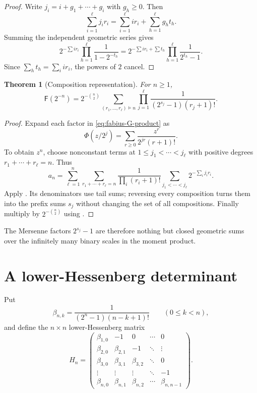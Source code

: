 \documentclass[11pt,oneside,openany]{book}
\newtheorem{theorem}{Theorem}[chapter]
\theoremstyle{definition}
\theoremstyle{remark}
\newcommand{\Fab}{\mathsf F}
\begin{document}
\begin{proof}
Write
$j_i=i+g_1+\cdots+g_i$ with $g_h\ge0$.  Then
\[
 \sum_{i=1}^\ell j_ir_i
 =\sum_{i=1}^\ell ir_i+\sum_{h=1}^\ell g_ht_h.
\]
Summing the independent geometric series gives
\[
 2^{-\sum ir_i}\prod_{h=1}^\ell\frac1{1-2^{-t_h}}
 =2^{-\sum ir_i+\sum t_h}\prod_{h=1}^\ell\frac1{2^{t_h}-1}.
\]
Since $\sum_ht_h=\sum_iir_i$, the powers of $2$ cancel.
\end{proof}

\begin{theorem}[Composition representation]\label{thm:fabius-composition}
For $n\ge1$,
\begin{equation}\label{eq:fabius-composition}
 \boxed{
 \Fab(2^{-n})=2^{-\binom n2}
 \sum_{(r_1,\ldots,r_\ell)\vDash n}
 \prod_{j=1}^\ell
 \frac1{(2^{s_j}-1)(r_j+1)!}.}
\end{equation}
\end{theorem}

\begin{proof}
Expand each factor in \eqref{eq:fabius-G-product} as
\[
 \Phi(z/2^j)=\sum_{r\ge0}\frac{z^r}{2^{jr}(r+1)!}.
\]
To obtain $z^n$, choose nonconstant terms at
$1\le j_1<\cdots<j_\ell$ with positive degrees
$r_1+\cdots+r_\ell=n$.  Thus
\[
 a_n=\sum_{\ell=1}^n
 \sum_{r_1+\cdots+r_\ell=n}
 \frac1{\prod_i(r_i+1)!}
 \sum_{j_1<\cdots<j_\ell}2^{-\sum_i j_ir_i}.
\]
Apply .  Its denominators use tail sums;
reversing every composition turns them into the prefix sums $s_j$ without
changing the set of all compositions.  Finally multiply by
$2^{-\binom n2}$ using .
\end{proof}

The Mersenne factors $2^{s_j}-1$ are therefore nothing but closed geometric
sums over the infinitely many binary scales in the moment product.

\section{A lower-Hessenberg determinant}

Put
\begin{equation}\label{eq:fabius-beta}
 \beta_{n,k}=\frac1{(2^n-1)(n-k+1)!}
 \qquad(0\le k<n),
\end{equation}
and define the $n\times n$ lower-Hessenberg matrix
\begin{equation}\label{eq:fabius-Hessenberg}
 H_n=
 \begin{pmatrix}
 \beta_{1,0}&-1&0&\cdots&0\\
 \beta_{2,0}&\beta_{2,1}&-1&\ddots&\vdots\\
 \beta_{3,0}&\beta_{3,1}&\beta_{3,2}&\ddots&0\\
 \vdots&\vdots&\vdots&\ddots&-1\\
 \beta_{n,0}&\beta_{n,1}&\beta_{n,2}&\cdots&\beta_{n,n-1}
 \end{pmatrix}.
\end{equation}
\end{document}

